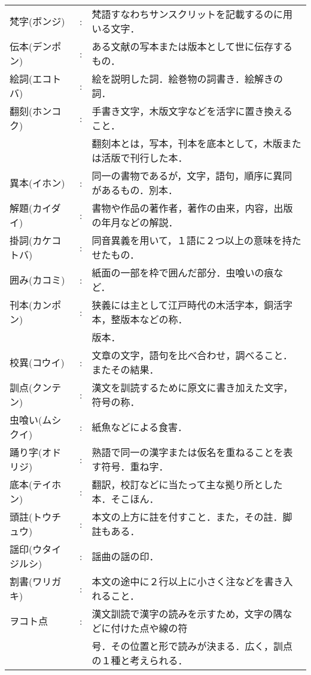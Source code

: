\begin{center}
  \begin{tabular}{l@{~}c@{~}l}
    梵字{\small (ボンジ)} &:&
      梵語すなわちサンスクリットを記載するのに用いる文字．\\
    伝本{\small (デンポン)} &:&
      ある文献の写本または版本として世に伝存するもの．\\
    絵詞{\small (エコトバ)} &:&
      絵を説明した詞．絵巻物の詞書き．絵解きの詞．\\
    翻刻{\small (ホンコク)} &:&
      手書き文字，木版文字などを活字に置き換えること．\\
    &&翻刻本とは，写本，刊本を底本として，木版または活版で刊行した本．\\
    異本{\small (イホン)}  &:&
      同一の書物であるが，文字，語句，順序に異同があるもの．別本．\\
    解題{\small (カイダイ)} &:&
      書物や作品の著作者，著作の由来，内容，出版の年月などの解説．\\
    掛詞{\small (カケコトバ)} &:&
      同音異義を用いて，１語に２つ以上の意味を持たせたもの．\\
    囲み{\small (カコミ)} &:&
      紙面の一部を枠で囲んだ部分．虫喰いの痕など．\\
    刊本{\small (カンポン)} &:&
      狭義には主として江戸時代の木活字本，銅活字本，整版本などの称．\\
    &&版本．\\
    校異{\small (コウイ)} &:&
      文章の文字，語句を比べ合わせ，調べること．またその結果．\\
    訓点{\small (クンテン)} &:&
      漢文を訓読するために原文に書き加えた文字，符号の称．\\
    虫喰い{\small (ムシクイ)} &:&
      紙魚などによる食害．\\
    踊り字{\small (オドリジ)} &:&
      熟語で同一の漢字または仮名を重ねることを表す符号．重ね字．\\
    底本{\small (テイホン)} &:&
      翻訳，校訂などに当たって主な拠り所とした本．そこほん．\\
    頭註{\small (トウチュウ)} &:&
      本文の上方に註を付すこと．また，その註．脚註もある．\\
    謡印{\small (ウタイジルシ)} &:&
      謡曲の謡の印．\\
    割書{\small (ワリガキ)} &:&
      本文の途中に２行以上に小さく注などを書き入れること．\\
    ヲコト点 &:&
      漢文訓読で漢字の読みを示すため，文字の隅などに付けた点や線の符\\
    &&号．その位置と形で読みが決まる．広く，訓点の１種と考えられる．\\
  \end{tabular}
\end{center}

